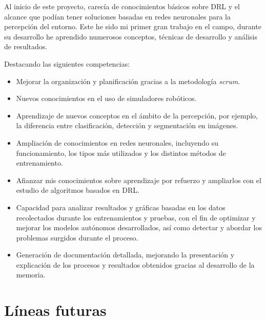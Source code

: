 Al inicio de este proyecto, carecía de conocimientos básicos sobre \ac{DRL} y el alcance que podían tener soluciones basadas en redes neuronales para la percepción del entorno. Este he sido mi primer gran trabajo en el campo, durante su desarrollo he aprendido numerosos conceptos, técnicas de desarrollo y análisis de resultados.

Destacando las siguientes competencias:

\begin{itemize}
\item Mejorar la organización y planificación gracias a la metodología \textit{scrum}.
\item Nuevos conocimientos en el uso de simuladores robóticos.
\item Aprendizaje de nuevos conceptos en el ámbito de la percepción, por ejemplo, la diferencia entre clasificación, detección y segmentación en imágenes.
\item Ampliación de conocimientos en redes neuronales, incluyendo su funcionamiento, los tipos más utilizados y los distintos métodos de entrenamiento.
\item Afianzar mis conocimientos sobre aprendizaje por refuerzo y ampliarlos con el estudio de algoritmos basados en \ac{DRL}.
\item Capacidad para analizar resultados y gráficas basadas en los datos recolectados durante los entrenamientos y pruebas, con el fin de optimizar y mejorar los modelos autónomos desarrollados, así como detectar y abordar los problemas surgidos durante el proceso.
\item Generación de documentación detallada, mejorando la presentación y explicación de los procesos y resultados obtenidos gracias al desarrollo de la memoria.
\end{itemize}

\section{Líneas futuras}

